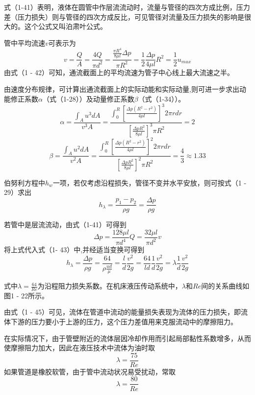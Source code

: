 式（1-41）表明，液体在圆管中作层流流动时，流量与管径的四次方成比例，压力差（压力损失）则与管径的四次方成反比，可见管径对流量及压力损失的影响是很大的。这个公式又叫泊肃叶公式。

管中平均流速$v$可表示为
\begin{equation}
v=\frac{Q}{A}=\frac{4Q}{\pi d^{2}}=\frac{\frac{\pi R^{4}}{8\mu l}\Delta p}{\pi R^{2}}=\frac{1}{2}\frac{\Delta p}{4\mu l}R^{2}=\frac{1}{2}u_{max}
\end{equation}
由式（1 - 42）可知，通流截面上的平均流速为管子中心线上最大流速之半。

由速度分布规律，可计算出通流截面上的实际动能和实际动量,则可进一步求出动能修正系数$\alpha$（式（1-28））及动量修正系数$\beta$（式（1-34））。
\begin{equation*}
\alpha =\frac{\int_{A}u^{3}dA}{v^{3}A}=\frac{\int_{0} ^{R}[\frac{\Delta p(R^{2}-r^{2})}{4\mu l}]^{3}2\pi rdr}{[\frac{\Delta pR^{2}}{8\mu l}]^{3}\pi R^{2}}=2
\end{equation*}
\begin{equation*}
\beta =\frac{\int_{A}u^{2}dA}{v^{2}A}=\frac{\int_{0} ^{R}[\frac{\Delta p(R^{2}-r^{2})}{4\mu l}]^{2}2\pi rdr}{[\frac{\Delta pR^{2}}{8\mu l}]^{2}\pi R^{2}}=\frac{4}{3}\approx 1.33
\end{equation*}

伯努利方程中$h_{w}$一项，若仅考虑沿程损失，管径不变并水平安放，则可按式（1 - 29）求出
\begin{equation}
h_{\lambda}=\frac{p_{1}-p_{2}}{\rho g}=\frac{\Delta p}{\rho g}
\end{equation}

若管中是层流流动，由式（1-41）可得到
\begin{equation}
\Delta p=\frac{128\mu l}{\pi d^{4}}Q=\frac{32\mu l}{\pi d^{2}}v
\end{equation}
将上式代入式（1- 43）中,并经适当变换可得到
\begin{equation}
h_{\lambda}=\frac{\Delta p}{\rho g}=\frac{64}{\rho \frac{ud}{\mu}}=\frac{l}{d} \frac{v^{2}}{2g}=\frac{64}{ld}\frac{1}{d}\frac{v^{2}}{2g}=\lambda \frac{1}{d}\frac{v^{2}}{2g}
\end{equation}

\noindent 式中$\lambda = \frac{64}{Re}$为沿程阻力损失系数。在机床液压传动系统中，$\lambda$和$Re$间的关系曲线如图1 - 22所示。 

由式（1 - 45）可见，流体在管道中流动的能量损失表现为流体的压力损失，即流体下游的压力要小于上游的压力，这个压力差值用来克服流动中的摩擦阻力。

在实际情况下，由于管壁附近的流体层因冷却作用而引起局部黏性系数增多，从而使摩擦阻力加大，因此在液压技术中流体为油时取
\begin{equation*}
\lambda= \frac{75}{Re}
\end{equation*}
如果管道是橡胶软管，由于管中流动状况易受扰动，常取
\begin{equation*}
\lambda= \frac{80}{Re}
\end{equation*}